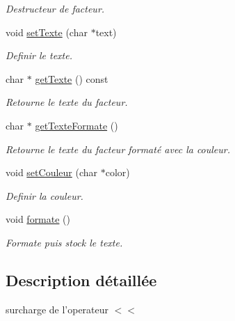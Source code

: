 \begin{DoxyCompactItemize}
\begin{DoxyCompactList}\small\item\em Destructeur de facteur. \item\end{DoxyCompactList}\item 
void \hyperlink{classFacteur_aa83b5bd6563b1f2cab21dddd90fc6666}{setTexte} (char $\ast$text)
\begin{DoxyCompactList}\small\item\em Definir le texte. \item\end{DoxyCompactList}\item 
char $\ast$ \hyperlink{classFacteur_abb372cdc3a252f6bef85bb50c7fb8714}{getTexte} () const 
\begin{DoxyCompactList}\small\item\em Retourne le texte du facteur. \item\end{DoxyCompactList}\item 
char $\ast$ \hyperlink{classFacteur_a887bb35c1fdff90040c91716abd15d62}{getTexteFormate} ()
\begin{DoxyCompactList}\small\item\em Retourne le texte du facteur formaté avec la couleur. \item\end{DoxyCompactList}\item 
void \hyperlink{classFacteur_ad17a1b26444aee5f6a474296c47c134a}{setCouleur} (char $\ast$color)
\begin{DoxyCompactList}\small\item\em Definir la couleur. \item\end{DoxyCompactList}\item 
\hypertarget{classFacteur_a16f36a57adf914658c50fbd527f2e2b8}{
void \hyperlink{classFacteur_a16f36a57adf914658c50fbd527f2e2b8}{formate} ()}
\label{classFacteur_a16f36a57adf914658c50fbd527f2e2b8}

\begin{DoxyCompactList}\small\item\em Formate puis stock le texte. \item\end{DoxyCompactList}\end{DoxyCompactItemize}


\subsection{Description détaillée}
surcharge de l'operateur $<$$<$ 

